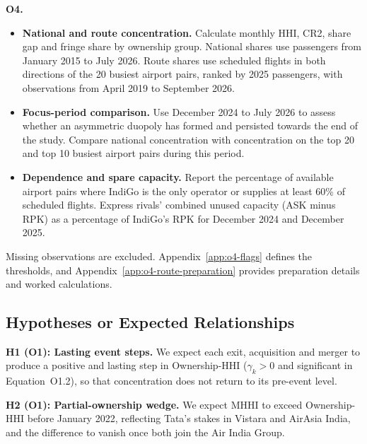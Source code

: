 \documentclass[12pt,a4paper]{article}
\newenvironment{authorcontribution}[1]{\par\begingroup\color{#1}}{\par\endgroup}
\newcommand{\HHI}{\textsc{hhi}}
\begin{document}


\begin{authorcontribution}{authorGoutham}
\label{sec:method-o4}
\textbf{O4.}
\begin{itemize}[leftmargin=2em]
    \item \textbf{National and route concentration.} Calculate monthly HHI, CR2, share gap and fringe share by ownership group. National shares use passengers from January 2015 to July 2026. Route shares use scheduled flights in both directions of the 20 busiest airport pairs, ranked by 2025 passengers, with observations from April 2019 to September 2026.
    \item \textbf{Focus-period comparison.} Use December 2024 to July 2026 to assess whether an asymmetric duopoly has formed and persisted towards the end of the study. Compare national concentration with concentration on the top 20 and top 10 busiest airport pairs during this period.
    \item \textbf{Dependence and spare capacity.} Report the percentage of available airport pairs where IndiGo is the only operator or supplies at least 60\% of scheduled flights. Express rivals' combined unused capacity (ASK minus RPK) as a percentage of IndiGo's RPK for December 2024 and December 2025.
\end{itemize}
Missing observations are excluded. Appendix~\ref{app:o4-flags} defines the thresholds, and Appendix~\ref{app:o4-route-preparation} provides preparation details and worked calculations.
\end{authorcontribution}

\subsection{Hypotheses or Expected Relationships}
\label{sec:hypotheses}
\begingroup
\normalfont\normalsize\rmfamily\upshape\mdseries\onehalfspacing
{}
\renewcommand{\HHI}{HHI}
\begin{authorcontribution}{authorSowmya}
\textbf{H1 (O1): Lasting event steps.} We expect each exit, acquisition and merger to produce a positive and lasting step in Ownership-HHI ($\gamma_k>0$ and significant in Equation~O1.2), so that concentration does not return to its pre-event level.

\textbf{H2 (O1): Partial-ownership wedge.} We expect MHHI to exceed Ownership-HHI before January 2022, reflecting Tata's stakes in Vistara and AirAsia India, and the difference to vanish once both join the Air India Group.
\end{authorcontribution}
\end{document}
